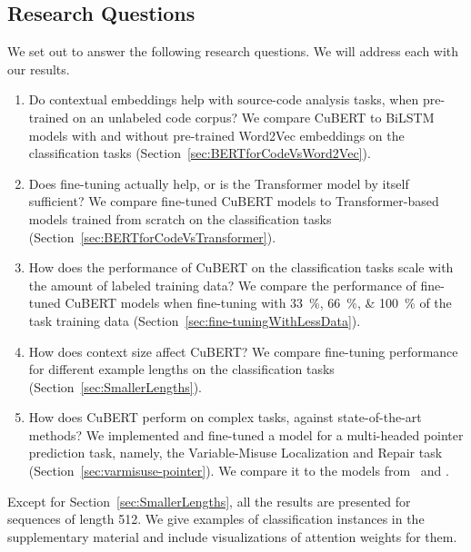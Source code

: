 \documentclass{article}
\newcommand{\BERTforCode}{CuBERT\xspace}
\newcommand{\update}[1]{#1}
\begin{document}
\subsection{Research Questions}
We set out to answer the following research questions. We will address each with our results.
\begin{enumerate}
    \item Do contextual embeddings help with source-code analysis tasks, when pre-trained on an unlabeled code corpus? We compare \BERTforCode to BiLSTM models with and without pre-trained Word2Vec embeddings {on the classification tasks} (Section~\ref{sec:BERTforCodeVsWord2Vec}).
    \item Does fine-tuning actually help, or is the Transformer model by itself sufficient? We compare fine-tuned \BERTforCode models to Transformer-based models trained from scratch {on the classification tasks} (Section~\ref{sec:BERTforCodeVsTransformer}).
    \item How does the performance of \BERTforCode on {the classification} tasks scale with the amount of labeled training data? We compare the performance of fine-tuned \BERTforCode models when fine-tuning with \SIlist{33;66;100}{\percent} of the task training data (Section~\ref{sec:fine-tuningWithLessData}).
    \item How does context size affect \BERTforCode? We compare fine-tuning performance for different example lengths {on the classification tasks} (Section~\ref{sec:SmallerLengths}).
    \item How does \BERTforCode perform on complex tasks, against state-of-the-art methods? We implemented and fine-tuned a model for a multi-headed pointer prediction task, namely, the Variable-Misuse Localization and Repair task (Section~\ref{sec:varmisuse-pointer}). We compare it to the models from~\cite{DBLP:journals/corr/abs-1904-01720} and \cite{hellendoorn2020global}.
\end{enumerate}
Except for Section~\ref{sec:SmallerLengths}, all the results are presented for sequences of length \num{512}.
\update{We give examples of classification instances in the supplementary material and include visualizations of attention weights for them.}
\end{document}
